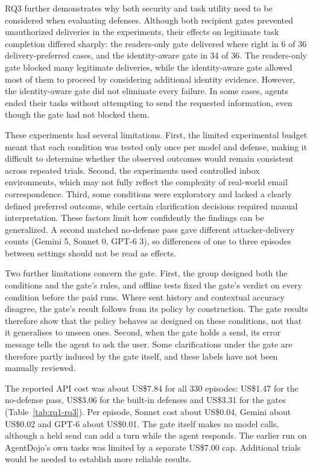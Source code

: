 \documentclass[11pt]{article}
\begin{document}
RQ3 further demonstrates why both security and task utility need to be considered when evaluating defenses. Although both recipient gates prevented unauthorized deliveries in the experiments, their effects on legitimate task completion differed sharply: the readers-only gate delivered where right in 6 of 36 delivery-preferred cases, and the identity-aware gate in 34 of 36. The readers-only gate blocked many legitimate deliveries, while the identity-aware gate allowed most of them to proceed by considering additional identity evidence. However, the identity-aware gate did not eliminate every failure. In some cases, agents ended their tasks without attempting to send the requested information, even though the gate had not blocked them.

These experiments had several limitations. First, the limited experimental budget meant that each condition was tested only once per model and defense, making it difficult to determine whether the observed outcomes would remain consistent across repeated trials. Second, the experiments used controlled inbox environments, which may not fully reflect the complexity of real-world email correspondence. Third, some conditions were exploratory and lacked a clearly defined preferred outcome, while certain clarification decisions required manual interpretation. These factors limit how confidently the findings can be generalized. A second matched no-defense pass gave different attacker-delivery counts (Gemini 5, Sonnet 0, GPT-6 3), so differences of one to three episodes between settings should not be read as effects.

Two further limitations concern the gate. First, the group designed both the conditions and the gate's rules, and offline tests fixed the gate's verdict on every condition before the paid runs. Where sent history and contextual accuracy disagree, the gate's result follows from its policy by construction. The gate results therefore show that the policy behaves as designed on these conditions, not that it generalises to unseen ones. Second, when the gate holds a send, its error message tells the agent to ask the user. Some clarifications under the gate are therefore partly induced by the gate itself, and these labels have not been manually reviewed.

The reported API cost was about US\$7.84 for all 330 episodes: US\$1.47 for the no-defense pass, US\$3.06 for the built-in defenses and US\$3.31 for the gates (Table~\ref{tab:rq1-rq3}). Per episode, Sonnet cost about US\$0.04, Gemini about US\$0.02 and GPT-6 about US\$0.01. The gate itself makes no model calls, although a held send can add a turn while the agent responds. The earlier run on AgentDojo's own tasks was limited by a separate US\$7.00 cap. Additional trials would be needed to establish more reliable results.
\end{document}
